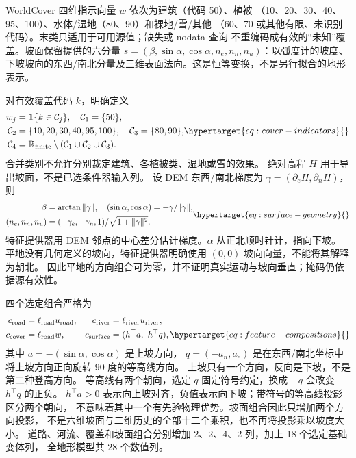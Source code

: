 WorldCover 四维指示向量 \(w\) 依次为建筑（代码 50）、植被
（10、20、30、40、95、100）、水体/湿地（80、90）和裸地/雪/其他
（60、70 或其他有限、未识别代码）。末类只适用于可用源值；缺失或 nodata 查询
不重编码成有效的“未知”覆盖。坡面保留提供的六分量
\(s=(\beta,\sin\alpha,\cos\alpha,n_e,n_n,n_u)\)：以弧度计的坡度、
下坡坡向的东西/南北分量及三维表面法向。这是恒等变换，不是另行拟合的地形表示。

对有效覆盖代码 \(k\)，明确定义
\begin{equation}
\begin{aligned}
w_j&=\mathbf1\{k\in\mathcal C_j\},\quad \mathcal C_1=\{50\},\\
\mathcal C_2&=\{10,20,30,40,95,100\},\quad\mathcal C_3=\{80,90\},\\
\mathcal C_4&=\R_{\rm finite}\setminus(\mathcal C_1\cup\mathcal C_2\cup\mathcal C_3).
\end{aligned}
\label{eq:cover-indicators}\hypertarget{eq:cover-indicators}{}
\end{equation}
合并类别不允许分别裁定建筑、各植被类、湿地或雪的效果。
绝对高程 \(H\) 用于导出坡面，不是已选条件器输入列。
设 DEM 东西/南北梯度为 \(\gamma=(\partial_eH,\partial_nH)\)，则
\begin{equation}
\begin{aligned}
\beta&=\arctan\|\gamma\|,\quad (\sin\alpha,\cos\alpha)=-\gamma/\|\gamma\|,\\
(n_e,n_n,n_u)&=(-\gamma_e,-\gamma_n,1)/\sqrt{1+\|\gamma\|^2}.
\end{aligned}
\label{eq:surface-geometry}\hypertarget{eq:surface-geometry}{}
\end{equation}
特征提供器用 DEM 邻点的中心差分估计梯度。\(\alpha\) 从正北顺时针计，指向下坡。
平地没有几何定义的坡向，特征提供器明确使用 \((0,0)\) 坡向向量，不能将其解释为朝北。
因此平地的方向组合可为零，并不证明真实运动与坡向垂直；掩码仍依据源有效性。

四个选定组合严格为
\begin{align}
c_{\rm road}&=\ell_{\rm road}u_{\rm road},&
c_{\rm river}&=\ell_{\rm river}u_{\rm river},\notag\\
c_{\rm cover}&=\ell_{\rm road}w,&
c_{\rm surface}&=(h^\top a,\ h^\top q),
\label{eq:feature-compositions}\hypertarget{eq:feature-compositions}{}
\end{align}
其中 \(a=-(\sin\alpha,\cos\alpha)\) 是上坡方向，
\(q=(-a_n,a_e)\) 是在东西/南北坐标中将上坡方向正向旋转 90 度的等高线方向。
上坡只有一个方向，反向是下坡，不是第二种登高方向。
等高线有两个朝向，选定 \(q\) 固定符号约定，换成 \(-q\) 会改变 \(h^\top q\) 的正负。
\(h^\top a>0\) 表示向上坡对齐，负值表示向下坡；带符号的等高线投影区分两个朝向，
不意味着其中一个有先验物理优势。坡面组合因此只增加两个方向投影，
不是六维坡面与二维历史的全部十二个乘积，也不再将投影乘以坡度大小。
道路、河流、覆盖和坡面组合分别增加 2、2、4、2 列，加上 18 个选定基础变体列，
全地形模型共 28 个数值列。

